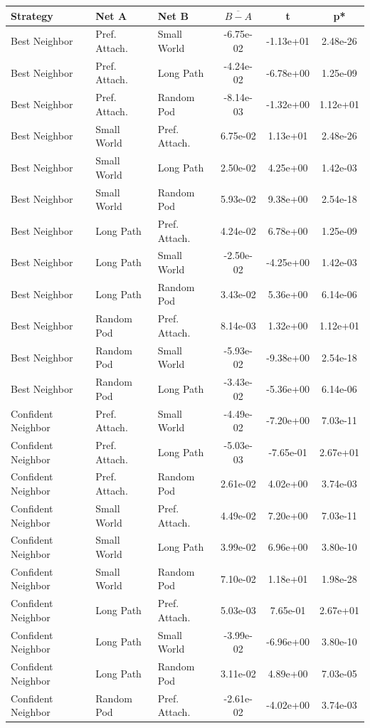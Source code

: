\begin{table}[]
    \centering
    \begin{tabular}{l|ll|ccc}
        Strategy & Net A & Net B & $\overline{B - A}$ & t & p* \\
    \hline
Best Neighbor&Pref. Attach.&Small World&-6.75e-02&-1.13e+01&2.48e-26\\
Best Neighbor&Pref. Attach.&Long Path&-4.24e-02&-6.78e+00&1.25e-09\\
Best Neighbor&Pref. Attach.&Random Pod&-8.14e-03&-1.32e+00&1.12e+01\\
Best Neighbor&Small World&Pref. Attach.&6.75e-02&1.13e+01&2.48e-26\\
Best Neighbor&Small World&Long Path&2.50e-02&4.25e+00&1.42e-03\\
Best Neighbor&Small World&Random Pod&5.93e-02&9.38e+00&2.54e-18\\
Best Neighbor&Long Path&Pref. Attach.&4.24e-02&6.78e+00&1.25e-09\\
Best Neighbor&Long Path&Small World&-2.50e-02&-4.25e+00&1.42e-03\\
Best Neighbor&Long Path&Random Pod&3.43e-02&5.36e+00&6.14e-06\\
Best Neighbor&Random Pod&Pref. Attach.&8.14e-03&1.32e+00&1.12e+01\\
Best Neighbor&Random Pod&Small World&-5.93e-02&-9.38e+00&2.54e-18\\
Best Neighbor&Random Pod&Long Path&-3.43e-02&-5.36e+00&6.14e-06\\
\hline
Confident Neighbor&Pref. Attach.&Small World&-4.49e-02&-7.20e+00&7.03e-11\\
Confident Neighbor&Pref. Attach.&Long Path&-5.03e-03&-7.65e-01&2.67e+01\\
Confident Neighbor&Pref. Attach.&Random Pod&2.61e-02&4.02e+00&3.74e-03\\
Confident Neighbor&Small World&Pref. Attach.&4.49e-02&7.20e+00&7.03e-11\\
Confident Neighbor&Small World&Long Path&3.99e-02&6.96e+00&3.80e-10\\
Confident Neighbor&Small World&Random Pod&7.10e-02&1.18e+01&1.98e-28\\
Confident Neighbor&Long Path&Pref. Attach.&5.03e-03&7.65e-01&2.67e+01\\
Confident Neighbor&Long Path&Small World&-3.99e-02&-6.96e+00&3.80e-10\\
Confident Neighbor&Long Path&Random Pod&3.11e-02&4.89e+00&7.03e-05\\
Confident Neighbor&Random Pod&Pref. Attach.&-2.61e-02&-4.02e+00&3.74e-03\\

\end{tabular}
\end{table}
